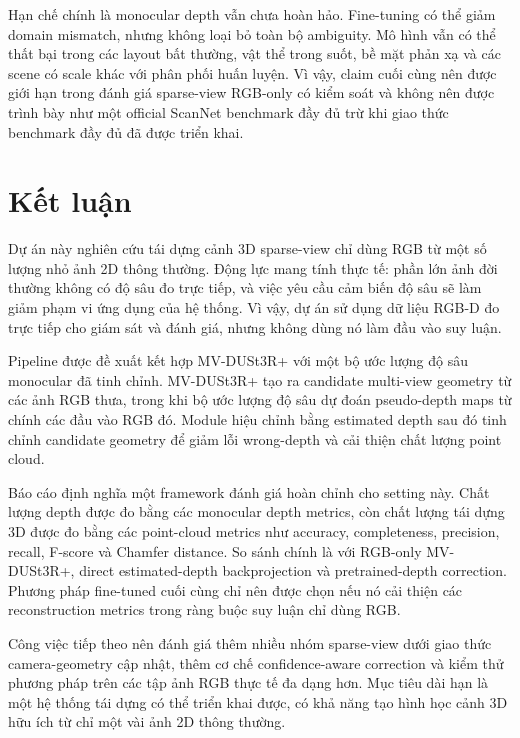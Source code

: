 \documentclass[12pt,a4paper]{article}
\newcommand{\mvdp}{MV-DUSt3R+}
\begin{document}
Hạn chế chính là monocular depth vẫn chưa hoàn hảo. Fine-tuning có thể giảm domain mismatch, nhưng không loại bỏ toàn bộ ambiguity. Mô hình vẫn có thể thất bại trong các layout bất thường, vật thể trong suốt, bề mặt phản xạ và các scene có scale khác với phân phối huấn luyện. Vì vậy, claim cuối cùng nên được giới hạn trong đánh giá sparse-view RGB-only có kiểm soát và không nên được trình bày như một official ScanNet benchmark đầy đủ trừ khi giao thức benchmark đầy đủ đã được triển khai.

\section{Kết luận}
Dự án này nghiên cứu tái dựng cảnh 3D sparse-view chỉ dùng RGB từ một số lượng nhỏ ảnh 2D thông thường. Động lực mang tính thực tế: phần lớn ảnh đời thường không có độ sâu đo trực tiếp, và việc yêu cầu cảm biến độ sâu sẽ làm giảm phạm vi ứng dụng của hệ thống. Vì vậy, dự án sử dụng dữ liệu RGB-D đo trực tiếp cho giám sát và đánh giá, nhưng không dùng nó làm đầu vào suy luận.

Pipeline được đề xuất kết hợp \mvdp{} với một bộ ước lượng độ sâu monocular đã tinh chỉnh. \mvdp{} tạo ra candidate multi-view geometry từ các ảnh RGB thưa, trong khi bộ ước lượng độ sâu dự đoán pseudo-depth maps từ chính các đầu vào RGB đó. Module hiệu chỉnh bằng estimated depth sau đó tinh chỉnh candidate geometry để giảm lỗi wrong-depth và cải thiện chất lượng point cloud.

Báo cáo định nghĩa một framework đánh giá hoàn chỉnh cho setting này. Chất lượng depth được đo bằng các monocular depth metrics, còn chất lượng tái dựng 3D được đo bằng các point-cloud metrics như accuracy, completeness, precision, recall, F-score và Chamfer distance. So sánh chính là với RGB-only \mvdp{}, direct estimated-depth backprojection và pretrained-depth correction. Phương pháp fine-tuned cuối cùng chỉ nên được chọn nếu nó cải thiện các reconstruction metrics trong ràng buộc suy luận chỉ dùng RGB.

Công việc tiếp theo nên đánh giá thêm nhiều nhóm sparse-view dưới giao thức camera-geometry cập nhật, thêm cơ chế confidence-aware correction và kiểm thử phương pháp trên các tập ảnh RGB thực tế đa dạng hơn. Mục tiêu dài hạn là một hệ thống tái dựng có thể triển khai được, có khả năng tạo hình học cảnh 3D hữu ích từ chỉ một vài ảnh 2D thông thường.
\end{document}
